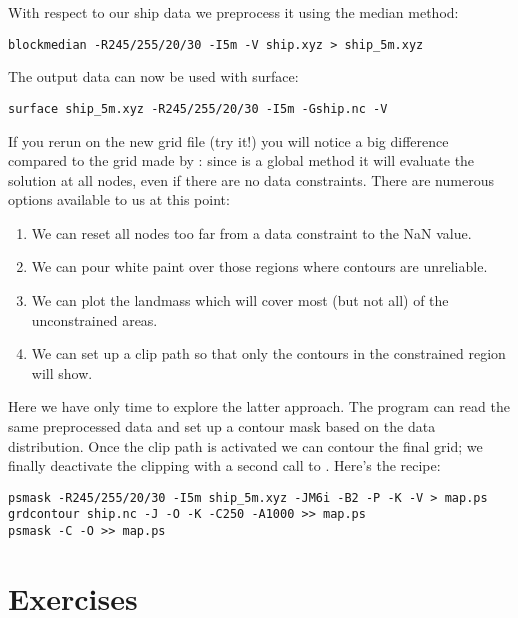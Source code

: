 \documentclass[11pt]{report}
\begin{document}
With respect to our ship data we preprocess it using the median method:

{\small\begin{verbatim}
blockmedian -R245/255/20/30 -I5m -V ship.xyz > ship_5m.xyz
\end{verbatim}
}

The output data can now be used with surface:

{\small\begin{verbatim}
surface ship_5m.xyz -R245/255/20/30 -I5m -Gship.nc -V
\end{verbatim}
}

If you rerun  on the new grid file (try it!)
you will notice a big difference compared to the grid made by
: since  is a global method
it will evaluate the solution at all nodes, even if there are no
data constraints.  There are numerous options available to us at
this point:

\begin{enumerate}

\item We can reset all nodes too far from a data constraint to the
NaN value.

\item We can pour white paint over those regions where contours
are unreliable.

\item We can plot the landmass which will cover most (but not all)
of the unconstrained areas.

\item We can set up a clip path so that only the contours in the
constrained region will show.

\end{enumerate}

Here we have only time to explore the latter approach.  The 
program can read the same preprocessed data and set up a contour mask
based on the data distribution.  Once the clip path is activated we can
contour the final grid; we finally deactivate the clipping with a second
call to .  Here's the recipe:

{\small\begin{verbatim}
psmask -R245/255/20/30 -I5m ship_5m.xyz -JM6i -B2 -P -K -V > map.ps
grdcontour ship.nc -J -O -K -C250 -A1000 >> map.ps
psmask -C -O >> map.ps
\end{verbatim}
}

\section{Exercises}
\end{document}
